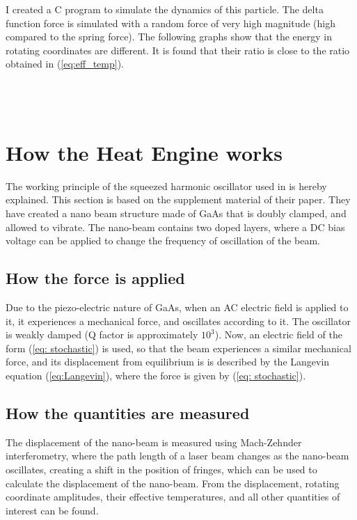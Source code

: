 \documentclass[12pt, twoside]{article}
\begin{document}
I created a C program \cite{link_to_c_code} to simulate the dynamics of this particle. The delta function force is simulated with a random force of very high magnitude (high compared to the spring force).
The following graphs show that the energy in rotating coordinates are different. It is found that their ratio is close to the ratio obtained in (\ref{eq:eff_temp}).\\\\\\\\

\section{How the Heat Engine works}
The working principle of the squeezed harmonic oscillator used in \cite{klaers} is hereby explained. This section is based on the supplement material \cite{klaers_supplement} of their paper. They have created a nano beam structure made of GaAs that is doubly clamped, and allowed to vibrate. The nano-beam contains two doped layers, where a DC bias voltage can be applied to change the frequency of oscillation of the beam. 
\subsection{How the force is applied}
Due to the piezo-electric nature of GaAs, when an AC electric field is applied to it, it experiences a mechanical force, and oscillates according to it. The oscillator is weakly damped (Q factor is approximately $10^3$). Now, an electric field of the form (\ref{eq: stochastic}) is used, so that the beam experiences a similar mechanical force, and its displacement from equilibrium is is described by the Langevin equation (\ref{eq:Langevin}), where the force is given by (\ref{eq: stochastic}).
\subsection{How the quantities are measured}
The displacement of the nano-beam is measured using Mach-Zehnder interferometry, where the path length of a laser beam changes as the nano-beam oscillates, creating a shift in the position of fringes, which can be used to calculate the displacement of the nano-beam. From the displacement, rotating coordinate amplitudes, their effective temperatures, and all other quantities of interest can be found.
\end{document}
